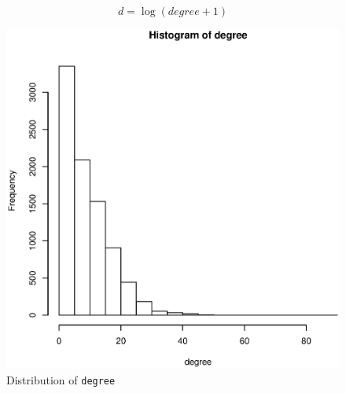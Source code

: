 \documentclass[11pt, fleqn]{article}
\begin{document}
\begin{equation}
d = \log(degree+1)
\end{equation}

\begin{figure}[!htb]
  \centering
  \includegraphics[scale=.5]{degrees.eps}
  \caption{Distribution of \texttt{degree}}
  \label{fig:degrees}
\end{figure}
\end{document}
